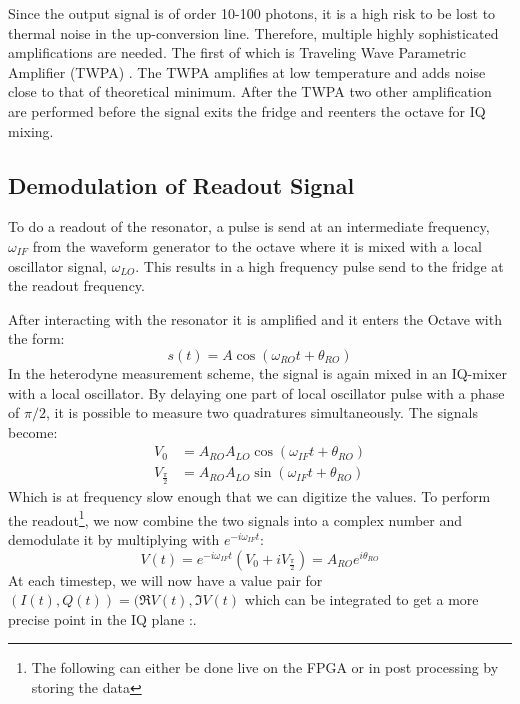 Since the output signal is of order 10-100 photons, it is a high risk to be lost to thermal noise in the up-conversion line. Therefore, multiple highly sophisticated amplifications are needed. The first of which is Traveling Wave Parametric Amplifier (TWPA) \cite{macklin_nearquantum-limited_2015}. The TWPA amplifies at low temperature and adds noise close to that of theoretical minimum. After the TWPA two other amplification are performed before the signal exits the fridge and reenters the octave for IQ mixing. 


\subsection{Demodulation of Readout Signal}\label{sec:demodulation}
To do a readout of the resonator, a pulse is send at an intermediate frequency, $\omega_{IF}$ from the waveform generator to the octave where it is mixed with a local oscillator signal, $\omega_{LO}$. This results in a high frequency pulse send to the fridge at the readout frequency.

After interacting with the resonator it is amplified and it enters the Octave with the form:
\begin{equation}
    s(t) = A \cos(\omega_{RO}t + \theta_{RO}) 
\end{equation}
In the heterodyne measurement scheme, the signal is again mixed in an IQ-mixer with a local oscillator. By delaying one part of local oscillator pulse with a phase of $\pi / 2$, it is possible to measure two quadratures simultaneously. The signals become:
\begin{align}
    V_0               &= A_{RO}A_{LO} \cos(\omega_{IF}t + \theta_{RO}) \\
    V_{\frac{\pi}{2}} &= A_{RO}A_{LO} \sin(\omega_{IF}t + \theta_{RO})
\end{align}
Which is at frequency slow enough that we can digitize the values. To perform the readout\footnote{The following can either be done live on the FPGA or in post processing by storing the data}, we now combine the two signals into a complex number and demodulate it by multiplying with $e^{-i\omega_{IF}t}$:
\begin{equation}
    V(t) = e^{-i\omega_{IF} t} (V_0 + i V_{\frac{\pi}{2}}) = A_{RO} e^{i\theta_{RO}}
\end{equation}
At each timestep, we will now have a value pair for $(I(t), Q(t)) = (\Re{V(t)}, \Im{V(t)}$ which can be integrated to get a more precise point in the IQ plane \cite{krantz_quantum_2019}:. 

